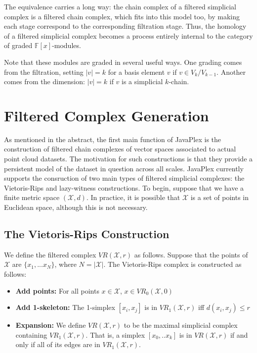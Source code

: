 \documentclass[10pt]{article}
\begin{document}
The equivalence carries a long way: the chain complex of a filtered
simplicial complex is a filtered chain complex, which fits into this
model too, by making each stage correspond to the corresponding
filtration stage. Thus, the homology of a filtered simplicial complex
becomes a process entirely internal to the category of graded $\mathbb{F}[x]$-modules.

Note that these modules are graded in several useful ways. One grading
comes from the filtration, setting $|v|=k$ for a basis element $v$ if
$v\in V_k/V_{k-1}$. Another comes from the dimension: $|v|=k$ if $v$
is a simplicial $k$-chain.



\section{Filtered Complex Generation}

As mentioned in the abstract, the first main function of JavaPlex is the construction of filtered chain complexes of vector spaces associated to actual point cloud datasets. The motivation for such constructions is that they provide a persistent model of the dataset in question across all scales. JavaPlex currently supports the consruction of two main types of filtered simplicial complexes: the Vietoris-Rips and lazy-witness constructions. To begin, suppose that we have a finite metric space $(\mathcal{X}, d)$. In practice, it is possible that $\mathcal{X}$ is a set of points in Euclidean space, although this is not necessary.

\subsection{The Vietoris-Rips Construction}
We define the filtered complex $VR(\mathcal{X}, r)$ as follows. Suppose that the points of $\mathcal{X}$ are $\{x_1, ... x_N\}$, where $N = |\mathcal{X}|$. The Vietoris-Rips complex is constructed as follows:

\begin{itemize}
\item {\bf Add points:} For all points $x \in \mathcal{X}$, $x \in VR_0(\mathcal{X}, 0)$
\item {\bf Add 1-skeleton:} The 1-simplex $[x_i, x_j]$ is in $VR_1(\mathcal{X}, r)$ iff $d(x_i, x_j) \leq r$
\item {\bf Expansion:} We define $VR(\mathcal{X}, r)$ to be the maximal simplicial complex containing $VR_1(\mathcal{X}, r)$. That is, a simplex $[x_0, .. x_k]$ is in $VR(\mathcal{X}, r)$ if and only if all of its edges are in $VR_1(\mathcal{X}, r)$.
\end{itemize}
\end{document}
